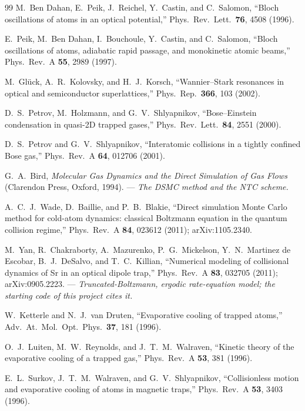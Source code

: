 \documentclass[11pt,a4paper]{article}
\begin{document}
\begin{thebibliography}{99}
 M.~Ben Dahan, E.~Peik, J.~Reichel, Y.~Castin, and C.~Salomon, ``Bloch oscillations of atoms in an optical potential,'' Phys.\ Rev.\ Lett.\ \textbf{76}, 4508 (1996).

 E.~Peik, M.~Ben Dahan, I.~Bouchoule, Y.~Castin, and C.~Salomon, ``Bloch oscillations of atoms, adiabatic rapid passage, and monokinetic atomic beams,'' Phys.\ Rev.\ A \textbf{55}, 2989 (1997).

 M.~Glück, A.~R.~Kolovsky, and H.~J.~Korsch, ``Wannier--Stark resonances in optical and semiconductor superlattices,'' Phys.\ Rep.\ \textbf{366}, 103 (2002).

 D.~S.~Petrov, M.~Holzmann, and G.~V.~Shlyapnikov, ``Bose--Einstein condensation in quasi-2D trapped gases,'' Phys.\ Rev.\ Lett.\ \textbf{84}, 2551 (2000).

 D.~S.~Petrov and G.~V.~Shlyapnikov, ``Interatomic collisions in a tightly confined Bose gas,'' Phys.\ Rev.\ A \textbf{64}, 012706 (2001).

 G.~A.~Bird, \emph{Molecular Gas Dynamics and the Direct Simulation of Gas Flows} (Clarendon Press, Oxford, 1994). --- \emph{The DSMC method and the NTC scheme.}

 A.~C.~J.~Wade, D.~Baillie, and P.~B.~Blakie, ``Direct simulation Monte Carlo method for cold-atom dynamics: classical Boltzmann equation in the quantum collision regime,'' Phys.\ Rev.\ A \textbf{84}, 023612 (2011); arXiv:1105.2340.

 M.~Yan, R.~Chakraborty, A.~Mazurenko, P.~G.~Mickelson, Y.~N.~Martinez de Escobar, B.~J.~DeSalvo, and T.~C.~Killian, ``Numerical modeling of collisional dynamics of Sr in an optical dipole trap,'' Phys.\ Rev.\ A \textbf{83}, 032705 (2011); arXiv:0905.2223. --- \emph{Truncated-Boltzmann, ergodic rate-equation model; the starting code of this project cites it.}

 W.~Ketterle and N.~J.~van Druten, ``Evaporative cooling of trapped atoms,'' Adv.\ At.\ Mol.\ Opt.\ Phys.\ \textbf{37}, 181 (1996).

 O.~J.~Luiten, M.~W.~Reynolds, and J.~T.~M.~Walraven, ``Kinetic theory of the evaporative cooling of a trapped gas,'' Phys.\ Rev.\ A \textbf{53}, 381 (1996).

 E.~L.~Surkov, J.~T.~M.~Walraven, and G.~V.~Shlyapnikov, ``Collisionless motion and evaporative cooling of atoms in magnetic traps,'' Phys.\ Rev.\ A \textbf{53}, 3403 (1996).


\end{thebibliography}
\end{document}
